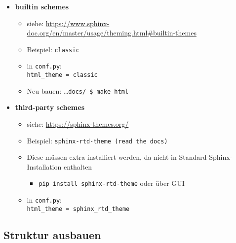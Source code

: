 \begin{itemize}
	\item
	      \textbf{builtin schemes}
	      \begin{itemize}
		      \item siehe:
		            \url{https://www.sphinx-doc.org/en/master/usage/theming.html\#builtin-themes}
		      \item
		            Beispiel: \texttt{classic}
		      \item
		            in \texttt{conf.py}:\\ \hspace*{0.5cm}
		            \texttt{html\_theme\ =\ \textquotesingle{}classic\textquotesingle{}}
		      \item Neu bauen:
		            \ldots{}\texttt{docs/\ \$\ make\ html}
	      \end{itemize}
	\item
	      \textbf{third-party schemes}
	      \begin{itemize}
		      \item siehe:
		            \url{https://sphinx-themes.org/}
		      \item
		            Beispiel: \texttt{sphinx-rtd-theme\ (read\ the\ docs)}
		      \item
		            Diese müssen extra installiert werden, da nicht in Standard-Sphinx-Installation
		            enthalten
		            \begin{itemize}

			            \item
			                  \texttt{pip\ install\ sphinx-rtd-theme} oder über GUI
		            \end{itemize}
		      \item
		            in \texttt{conf.py}:\\ \hspace*{0.5cm}
		            \texttt{html\_theme\ =\ \textquotesingle{}sphinx\_rtd\_theme\textquotesingle{}}
	      \end{itemize}
\end{itemize}


\subsection{Struktur ausbauen}

